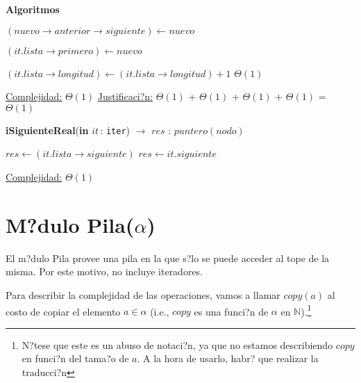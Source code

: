 \documentclass[a4paper,10pt]{article}
\let\TipoVariable=\texttt
\let\ModificadorArgumento=\textbf
\newcommand{\In}[2]{\ModificadorArgumento{in} \ensuremath{#1}\,: \TipoVariable{#2}\xspace}
\newenvironment{Algoritmos}{%
  \vspace*{2ex}%
  \noindent\textbf{\Large Algoritmos}%
  \vspace*{2ex}%
}{}
\begin{document}
\begin{Algoritmos}
\begin{algorithm}[H]
\begin{algorithmic}[1]
			\State $(nuevo\rightarrow anterior\rightarrow siguiente) \gets nuevo$ 
			
				\State $(it.lista\rightarrow primero) \gets nuevo$
			\EndIf
			
			\State $(it.lista\rightarrow longitud) \gets (it.lista\rightarrow longitud) + 1$	\Comment $\Theta(1)$

			\medskip
			\Statex \underline{Complejidad:} $\Theta(1)$
			\Statex \underline{Justificaci?n:} $\Theta(1)$ + $\Theta(1)$ + $\Theta(1)$ +  $\Theta(1)$ =  $\Theta(1)$
    	\end{algorithmic}
\end{algorithm}

	
\begin{algorithm}[H]
	\begin{algorithmic}
		\State \textbf{iSiguienteReal}(\In{it}{iter}) $\to$ $res$ : $puntero(nodo)$ 
			
			 
				\State $res \gets (it.lista\rightarrow siguiente)$
			\Else
				\State $res \gets it.siguiente$
			\EndIf
			
			\medskip
			\Statex \underline{Complejidad:} $\Theta(1)$
    	\end{algorithmic}
\end{algorithm}
%    
	
\end{Algoritmos}

\newpage

\section{M?dulo Pila($\alpha$)}

El m?dulo Pila provee una pila en la que s?lo se puede acceder al tope de la misma.  Por este motivo, no incluye iteradores.

Para describir la complejidad de las operaciones, vamos a llamar $copy(a)$ al costo de copiar el elemento $a \in \alpha$ (i.e., $copy$ es una funci?n de $\alpha$ en $\mathbb{N}$).\footnote{N?tese que este es un abuso de notaci?n, ya que no estamos describiendo $copy$ en funci?n del tama?o de $a$.  A la hora de usarlo, habr? que realizar la traducci?n}
\end{document}
